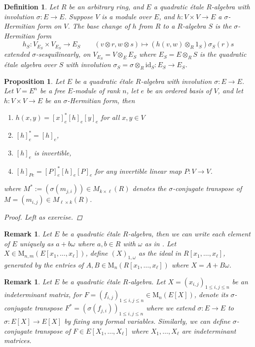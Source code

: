 \documentclass[10pt]{book}
\theoremstyle{bookplain}
\newtheorem{proposition}[theorem]{Proposition}
\theoremstyle{bookdefinition}
\newtheorem{definition}[theorem]{Definition}
\theoremstyle{bookremark}
\newtheorem{remark}[theorem]{Remark}
\begin{document}
\begin{definition}Let $R$ be an arbitrary ring, and $E$ a quadratic étale $R$-algebra with involution $\sigma:E\rightarrow E$. Suppose $V$ is a module over $E$, and $h:V\times V\rightarrow E$ a $\sigma$-Hermitian form on $V$. 
    The \textit{base change} of $h$ from $R$ to a $R$-algebra $S$ is the $\sigma$-Hermitian form 
    \[h_S:V_{E_S}\times V_{E_S}\rightarrow E_S\qquad (v\otimes r,w\otimes s)\mapsto (h(v,w)\otimes_R 1_S)\sigma_S(r)s \]
    extended $\sigma$-sesquilinearly, on $V_{E_S}=V\otimes_E E_S$ where $E_S=E\otimes_R S$ is the quadratic étale algebra over $S$ with involution $\sigma_S=\sigma\otimes_R \mathrm{id}_S:E_S\rightarrow E_S$. 
\end{definition}
\begin{proposition}Let $E$ be a quadratic étale $R$-algebra with involution $\sigma:E\rightarrow E$. Let $V=E^{n}$ be a free $E$-module of rank $n$, let $e$ be an ordered basis of $V$, and let $h:V\times V\rightarrow E$ be an $\sigma$-Hermitian form, then
    \begin{enumerate}
        \item $h(x,y)=[x]_{e}^* [h]_e [y]_e$ for all $x,y\in V$
        \item $[h]_e^{*}=[h]_e$,
        \item  $[h]_e$ is invertible,
        \item $[h]_{Pe}=[P]^{*}_e[h]_e[P]_e$ for any invertible linear map $P:V\rightarrow V$.
    \end{enumerate}
    where $M^*:=(\sigma(m_{j,i}))\in M_{k\times \ell}(R)$ denotes the $\sigma$-conjugate transpose of $M=(m_{i,j})\in M_{\ell\times k}(R)$.
    \begin{proof}Left as exercise.
    \end{proof}
\end{proposition}
\begin{remark}
    Let $E$ be a quadratic étale $R$-algebra, then we can write each element of $E$ uniquely as $a+b\omega$ where $a,b\in R$ with $\omega$ as in . Let $X\in \mathrm{M}_{n,m}(E[x_1,\dots,x_\ell])$, define $(X)_{1,\omega}$ as the ideal in $R[x_1,\dots,x_\ell]$, generated by the entries of $A,B\in \mathrm M_n(R[x_1,\dots,x_\ell])$ where $X=A+B\omega$. 
\end{remark}
\begin{remark}Let $E$ be a quadratic étale $R$-algebra. Let $X=(x_{i,j})_{1\le i,j\le n}$ be an indeterminant matrix, for $F=(f_{i,j})_{1\le i,j\le n}\in \mathrm{M}_n(E[X])$, denote its $\sigma$-conjugate transpose $F^*=(\sigma(f_{j,i}))_{1\le i,j\le n}$ where we extend $\sigma:E\rightarrow E$ to $\sigma:E[X]\rightarrow E[X]$ by fixing any formal variables. Similarly, we can define $\sigma$-conjugate transpose of $F\in E[X_1,\dots,X_\ell]$ where $X_1,\dots,X_{\ell}$ are indeterminant matrices. 
\end{remark}
\end{document}
